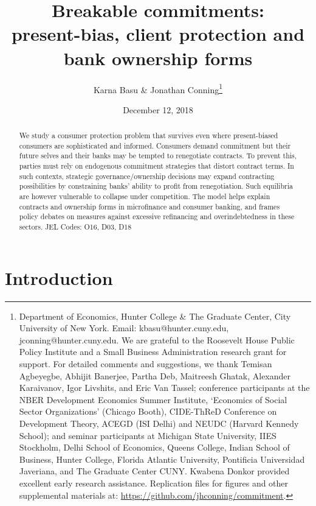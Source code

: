 \documentclass[11pt,english]{article}
\date{December 12, 2018}\usepackage{babel}
\theoremstyle{plain}
\theoremstyle{definition}
\begin{document}
\title{Breakable commitments: \\
 present-bias, client protection and bank ownership forms}

\author{Karna Basu \& Jonathan Conning\thanks{Department of Economics, Hunter College \& The Graduate Center, City
University of New York. Email: kbasu@hunter.cuny.edu, jconning@hunter.cuny.edu.
We are grateful to the Roosevelt House Public Policy Institute and
a Small Business Administration research grant for support. For detailed
comments and suggestions, we thank Temisan Agbeyegbe, Abhijit Banerjee,
Partha Deb, Maitreesh Ghatak, Alexander Karaivanov, Igor Livshits,
and Eric Van Tassel; conference participants at the NBER Development
Economics Summer Institute, `Economics of Social Sector Organizations'
(Chicago Booth), CIDE-ThReD Conference on Development Theory, ACEGD
(ISI Delhi) and NEUDC (Harvard Kennedy School); and seminar participants
at Michigan State University, IIES Stockholm, Delhi School of Economics,
Queens College, Indian School of Business, Hunter College, Florida
Atlantic University, Pontificia Universidad Javeriana, and The Graduate
Center CUNY. Kwabena Donkor provided excellent early research assistance.
Replication files for figures and other supplemental materials at:
\protect\protect\protect\url{https://github.com/jhconning/commitment}.}}
\maketitle 
\begin{abstract}
We study a consumer protection problem that survives even where present-biased consumers are sophisticated and informed. Consumers demand commitment but their future selves and their banks may be tempted to renegotiate contracts. To prevent this, parties must rely on endogenous commitment strategies that distort contract terms. In such contexts, strategic governance/ownership decisions may expand contracting possibilities by constraining banks' ability to profit from renegotiation. Such equilibria are however vulnerable to collapse under competition. The model helps explain contracts and ownership forms in microfinance and consumer banking, and frames policy debates on measures against excessive refinancing and overindebtedness in these sectors. JEL Codes: O16, D03, D18 
\end{abstract}
\newpage{}

\section{Introduction}
\end{document}
